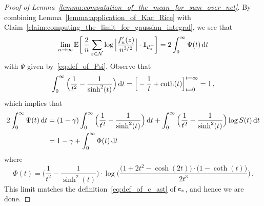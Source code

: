 \documentclass[11pt]{amsart}
\theoremstyle{remark}
\theoremstyle{definition}
\newcommand{\bE}{\mathbb E}
\newcommand{\cC}{\mathcal C}
\newcommand{\cN}{\mathcal N}
\newcommand{\one}{\boldsymbol{1}}
\begin{document}
    \begin{proof}[Proof of Lemma~\ref{lemma:computation_of_the_mean_for_sum_over_net}]
        By combining Lemma~\ref{lemma:application_of_Kac_Rice} with Claim~\ref{claim:computing_the_limit_for_gaussian_integral}, we see that 
        \[
        \lim_{n\to\infty} \bE\bigg[ \,  \frac{2}{n} \sum_{z \in \cN} \log \Big|\frac{f_n'(z)}{n^{3/2}} \Big| \cdot \one_{\cC_z^+} \bigg] = 2\int_0^\infty \Psi(t) \, {\rm d}t
        \]
        with $\Psi$ given by~\eqref{eq:def_of_Psi}. Observe that
        \[
        \int_{0}^\infty \Big(\frac{1}{t^2} - \frac{1}{\sinh^2(t)}\Big) \, {\rm d}t = \Big[-\frac{1}{t} + \coth(t) \Big]_{t=0}^{t=\infty} = 1 \, ,
        \]
        which implies that
        \begin{align*}
            2\int_{0}^{\infty} \Psi(t) \, {\rm d}t &= (1-\gamma) \int_{0}^\infty \Big(\frac{1}{t^2} - \frac{1}{\sinh^2(t)}\Big) \, {\rm d}t + \int_{0}^\infty \Big(\frac{1}{t^2} - \frac{1}{\sinh^2(t)}\Big) \log S(t) \, {\rm d}t \\ &= 1-\gamma + \int_{0}^\infty \Phi(t) \, {\rm d}t 
        \end{align*}
        where
        \[
        \Phi(t) = \Big(\frac{1}{t^2} - \frac{1}{\sinh^2(t)}\Big) \cdot \log \bigg( \frac{\big(1+2t^2-\cosh(2t)\big)\cdot \big( 1-\coth(t)\big)}{2t^3} \bigg) \, .
        \]
        This limit matches the definition~\eqref{eq:def_of_c_ast} of ${\sf c}_\ast$, and hence we are done. 
    \end{proof}
    
\end{document}

